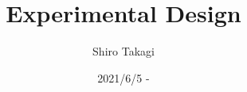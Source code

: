 \documentclass[12pt]{article}
\begin{document}
\title{Experimental Design}
\author{Shiro Takagi}
\date{2021/6/5 -}
\maketitle



\end{document}

